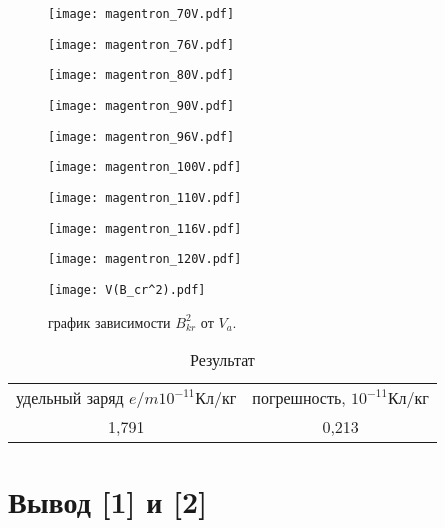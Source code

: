 \documentclass[a4paper,12pt]{article}
\theoremstyle{definition}
\begin{document}
\begin{figure}[H]
    \centering
    \texttt{[image: magentron\_70V.pdf]}
\end{figure}

\begin{figure}[H]
    \centering
    \texttt{[image: magentron\_76V.pdf]}
\end{figure}
\begin{figure}[H]
    \centering
    \texttt{[image: magentron\_80V.pdf]}
\end{figure}
\begin{figure}[H]
    \centering
    \texttt{[image: magentron\_90V.pdf]}
\end{figure}
\begin{figure}[H]
    \centering
    \texttt{[image: magentron\_96V.pdf]}
\end{figure}
\begin{figure}[H]
    \centering
    \texttt{[image: magentron\_100V.pdf]}
\end{figure}
\begin{figure}[H]
    \centering
    \texttt{[image: magentron\_110V.pdf]}
\end{figure}
\begin{figure}[H]
    \centering
    \texttt{[image: magentron\_116V.pdf]}
\end{figure}
\begin{figure}[H]
    \centering
    \texttt{[image: magentron\_120V.pdf]}
\end{figure}

\begin{figure}[H]
    \centering
    \texttt{[image: V(B\_cr^2).pdf]}
    \caption{график зависимости $B_{kr}^2$ от $V_a$.}
\end{figure}

\begin{table}[H]
    \centering
    \begin{tabular}{cc}
         удельный заряд $e/m 10^{-11} Кл/кг$& погрешность, $10^{-11} Кл/кг$\\
         1,791& 0,213\\
    \end{tabular}
    \caption{Результат}
    \label{tab:my_label}
\end{table}

\section{Вывод [1] и [2]}
\end{document}
